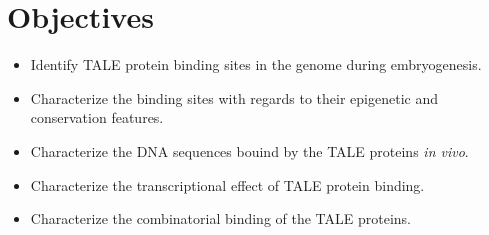 \chapter{Objectives}
\label{chp:objectives}

\begin{itemize}
  \item Identify TALE protein binding sites in the genome during embryogenesis.
  
  \item Characterize the binding sites with regards to their epigenetic and conservation features.
  
  \item Characterize the DNA sequences bouind by the TALE proteins \textit{in vivo}.
  
  \item Characterize the transcriptional effect of TALE protein binding.
  
  \item Characterize the combinatorial binding of the TALE proteins.
  
\end{itemize}